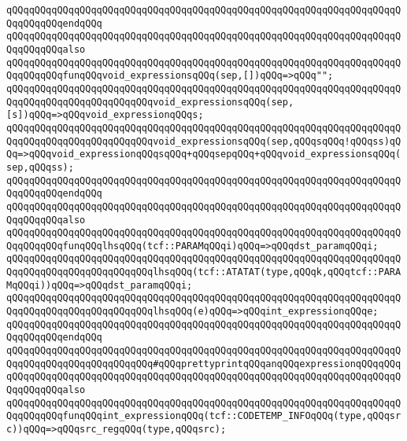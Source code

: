 \verb|qQQqqQQqqQQqqQQqqQQqqQQqqQQqqQQqqQQqqQQqqQQqqQQqqQQqqQQqqQQqqQQqqQQqqQQqqQQqqQQqendqQQq|\newline
\newline
\verb|qQQqqQQqqQQqqQQqqQQqqQQqqQQqqQQqqQQqqQQqqQQqqQQqqQQqqQQqqQQqqQQqqQQqqQQqqQQqqQQqalso|\newline
\verb|qQQqqQQqqQQqqQQqqQQqqQQqqQQqqQQqqQQqqQQqqQQqqQQqqQQqqQQqqQQqqQQqqQQqqQQqqQQqqQQqfunqQQqvoid_expressionsqQQq(sep,[])qQQq=>qQQq"";|\newline
\verb|qQQqqQQqqQQqqQQqqQQqqQQqqQQqqQQqqQQqqQQqqQQqqQQqqQQqqQQqqQQqqQQqqQQqqQQqqQQqqQQqqQQqqQQqqQQqqQQqvoid_expressionsqQQq(sep,[s])qQQq=>qQQqvoid_expressionqQQqs;|\newline
\verb|qQQqqQQqqQQqqQQqqQQqqQQqqQQqqQQqqQQqqQQqqQQqqQQqqQQqqQQqqQQqqQQqqQQqqQQqqQQqqQQqqQQqqQQqqQQqqQQqvoid_expressionsqQQq(sep,qQQqsqQQq!qQQqss)qQQq=>qQQqvoid_expressionqQQqsqQQq+qQQqsepqQQq+qQQqvoid_expressionsqQQq(sep,qQQqss);|\newline
\verb|qQQqqQQqqQQqqQQqqQQqqQQqqQQqqQQqqQQqqQQqqQQqqQQqqQQqqQQqqQQqqQQqqQQqqQQqqQQqqQQqendqQQq|\newline
\newline
\verb|qQQqqQQqqQQqqQQqqQQqqQQqqQQqqQQqqQQqqQQqqQQqqQQqqQQqqQQqqQQqqQQqqQQqqQQqqQQqqQQqalso|\newline
\verb|qQQqqQQqqQQqqQQqqQQqqQQqqQQqqQQqqQQqqQQqqQQqqQQqqQQqqQQqqQQqqQQqqQQqqQQqqQQqqQQqfunqQQqlhsqQQq(tcf::PARAMqQQqi)qQQq=>qQQqdst_paramqQQqi;|\newline
\verb|qQQqqQQqqQQqqQQqqQQqqQQqqQQqqQQqqQQqqQQqqQQqqQQqqQQqqQQqqQQqqQQqqQQqqQQqqQQqqQQqqQQqqQQqqQQqqQQqlhsqQQq(tcf::ATATAT(type,qQQqk,qQQqtcf::PARAMqQQqi))qQQq=>qQQqdst_paramqQQqi;|\newline
\verb|qQQqqQQqqQQqqQQqqQQqqQQqqQQqqQQqqQQqqQQqqQQqqQQqqQQqqQQqqQQqqQQqqQQqqQQqqQQqqQQqqQQqqQQqqQQqqQQqlhsqQQq(e)qQQq=>qQQqint_expressionqQQqe;|\newline
\verb|qQQqqQQqqQQqqQQqqQQqqQQqqQQqqQQqqQQqqQQqqQQqqQQqqQQqqQQqqQQqqQQqqQQqqQQqqQQqqQQqendqQQq|\newline
\newline
\verb|qQQqqQQqqQQqqQQqqQQqqQQqqQQqqQQqqQQqqQQqqQQqqQQqqQQqqQQqqQQqqQQqqQQqqQQqqQQqqQQqqQQqqQQqqQQqqQQq#qQQqprettyprintqQQqanqQQqexpressionqQQqqQQq|\newline
\verb|qQQqqQQqqQQqqQQqqQQqqQQqqQQqqQQqqQQqqQQqqQQqqQQqqQQqqQQqqQQqqQQqqQQqqQQqqQQqqQQqalso|\newline
\verb|qQQqqQQqqQQqqQQqqQQqqQQqqQQqqQQqqQQqqQQqqQQqqQQqqQQqqQQqqQQqqQQqqQQqqQQqqQQqqQQqfunqQQqint_expressionqQQq(tcf::CODETEMP_INFOqQQq(type,qQQqsrc))qQQq=>qQQqsrc_regqQQq(type,qQQqsrc);|\newline
